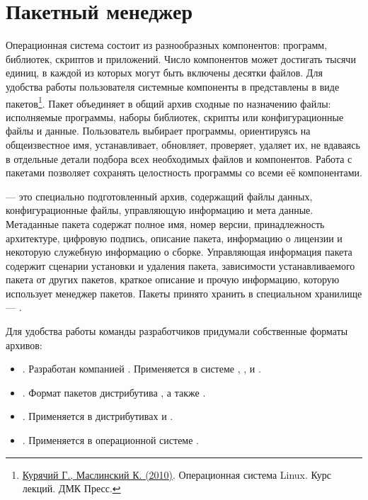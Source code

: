 \chapter{Пакетный менеджер}\label{package-manager}
Операционная система состоит из разнообразных компонентов: программ, библиотек, скриптов и приложений.
Число компонентов может достигать тысячи единиц, в каждой из которых могут быть включены десятки файлов.
Для удобства работы пользователя системные компоненты в  представлены в виде
пакетов\footnote{\href{https://docs.altlinux.org/books/altlibrary-linuxintro2.pdf}{Курячий Г., Маслинский К. (2010)}.
	Операционная система Linux. Курс лекций. ДМК Пресс.}. Пакет объединяет в общий архив сходные по назначению файлы: исполняемые программы, наборы библиотек, скрипты или конфигурационные файлы и данные.
Пользователь выбирает программы, ориентируясь на общеизвестное имя, устанавливает, обновляет, проверяет,
удаляет их, не вдаваясь в отдельные детали подбора всех необходимых файлов и компонентов.
Работа с пакетами позволяет сохранять целостность программы со всеми её компонентами.

 --- это специально подготовленный архив, содержащий файлы данных, конфигурационные файлы,
управляющую информацию и мета данные. Метаданные пакета содержат полное имя, номер версии, принадлежность
архитектуре, цифровую подпись, описание пакета, информацию о лицензии и некоторую служебную информацию
о сборке. Управляющая информация пакета содержит сценарии установки и удаления пакета, зависимости
устанавливаемого пакета от других пакетов, краткое описание и прочую информацию, которую использует
менеджер пакетов. Пакеты принято хранить в специальном хранилище --- .

Для удобства работы команды разработчиков придумали собственные форматы архивов:

\begin{itemize}
	\item {}. Разработан компанией . Применяется в системе , ,  и .
	\item {}. Формат пакетов дистрибутива , а также .
	\item {}. Применяется в дистрибутивах  и .
	\item {}. Применяется в операционной системе .
\end{itemize}

